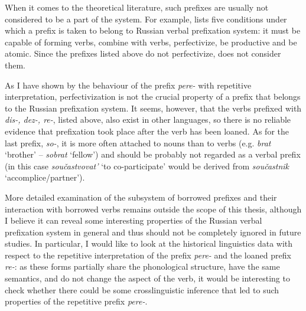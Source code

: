 When it comes to the theoretical literature, such prefixes are usually not considered to be a part of the system. For example, \citet[101-105]{Krongauz:98} lists five conditions under which a prefix is taken to belong to Russian verbal prefixation system: it must be capable of forming verbs, combine with verbs, perfectivize, be productive and be atomic. Since the prefixes listed above do not perfectivize, \citet[103]{Krongauz:98} does not consider them.

As I have shown by the behaviour of the prefix \textit{pere-} with repetitive interpretation, perfectivization is not the crucial property of a prefix that belongs to the Russian prefixation system. It seems, however, that the verbs prefixed with \textit{dis-, dez-, re-}, listed above, also exist in other languages, so there is no reliable evidence that prefixation took place after the verb has been loaned. As for the last prefix, \textit{so-}, it is more often attached to nouns than to verbs (e.g. \textit{brat} `brother' -- \textit{sobrat} `fellow') and should be probably not regarded as a verbal prefix (in this case \textit{sou\v{c}astvovat'} `to co-participate' would be derived from \textit{sou\v{c}astnik} `accomplice/partner'). 

More detailed examination of the subsystem of borrowed prefixes and their interaction with borrowed verbs remains outside the scope of this thesis, although I believe it can reveal some interesting properties of the Russian verbal prefixation system in general and thus should not be completely ignored in future studies. In particular, I would like to look at the historical linguistics data with respect to the repetitive interpretation of the prefix \textit{pere-} and the loaned prefix \textit{re-}: as these forms partially share the phonological structure, have the same semantics, and do not change the aspect of the verb, it would be interesting to check whether there could be some crosslinguistic inference that led to such properties of the repetitive prefix \textit{pere-}. 


